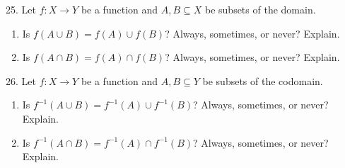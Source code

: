 \documentclass[10pt,]{book}
\theoremstyle{plain}
\theoremstyle{definition}
\theoremstyle{definition}
\numberwithin{equation}{chapter}
\newcommand{\inv}{^{-1}}
\begin{document}
\begin{exerciselist}
\begin{enumerate}[label=(\alph*)]
\end{enumerate}
%
\par\smallskip
\item[25.]\hypertarget{exercise-71}{}\hypertarget{p-825}{}%
Let \(f:X \to Y\) be a function and \(A, B \subseteq X\) be subsets of the domain. \leavevmode%
\begin{enumerate}[label=(\alph*)]
\item\hypertarget{li-539}{}\hypertarget{p-826}{}%
Is \(f(A \cup B) = f(A) \cup f(B)\)?  Always, sometimes, or never?  Explain.%
\item\hypertarget{li-540}{}\hypertarget{p-827}{}%
Is \(f(A \cap B) = f(A) \cap f(B)\)?  Always, sometimes, or never?  Explain.%
\end{enumerate}
%
\par\smallskip
\item[26.]\hypertarget{exercise-72}{}\hypertarget{p-831}{}%
Let \(f:X \to Y\) be a function and \(A, B \subseteq Y\) be subsets of the codomain. \leavevmode%
\begin{enumerate}[label=(\alph*)]
\item\hypertarget{li-543}{}\hypertarget{p-832}{}%
Is \(f\inv(A \cup B) = f\inv(A) \cup f\inv(B)\)?  Always, sometimes, or never?  Explain.%
\item\hypertarget{li-544}{}\hypertarget{p-833}{}%
Is \(f\inv(A \cap B) = f\inv(A) \cap f\inv(B)\)?  Always, sometimes, or never?  Explain.%
\end{enumerate}
%
\par\smallskip
\end{exerciselist}
\end{document}
